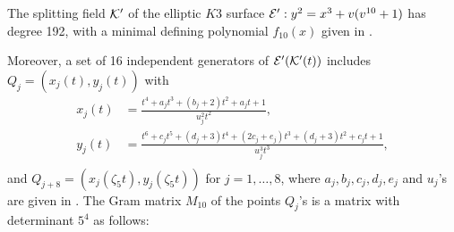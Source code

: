 \documentclass[11pt]{amsart}
\begin{document}
\begin{thm}
	\label{main1}
	The splitting field ${\mathcal K}'$ of the elliptic $K3$ surface  ${\mathcal E}': y^2=x^3+   v (v^{10}+1)$ has degree 192,  with  a minimal  defining polynomial $f_{10}(x)$ given in \cite[min-pols]{k3-codes}. 
	
	Moreover,  a set of 16 independent generators of ${\mathcal E}'({\mathcal K}'(t)) $ includes $Q_j=\left( x_j(t), y_j(t)\right) $ with
	$$\begin{aligned}
		x_j(t) &= \frac{t^4 + a_j t^3 + (b_j +2) t^2 + a_j t +1}{u_j^2  t^2}, \\
		y_j(t) &=\frac{t^6 +c_j t^5+ (d_j +3) t^4 +(2 c_j +e_j) t^3 +(d_j +3) t^2 + c_j t +1}{u_j^3 t^3},\\
	\end{aligned}
	$$
	and $Q_{j+8}=\left( x_{j}(\zeta_5 t), y_{j}( \zeta_5 t)\right) $  	for $j=1, \ldots, 8$,
	where   $a_j, b_j, c_j, d_j, e_j$  and  $u_j$'s are given in 
	 \cite[Points-10]{Shioda360-Codes}.
	 The Gram matrix $M_{10}$ of the  points $Q_j$'s is a matrix with determinant   $5^4$ as follows:
	 

\end{thm}
\end{document}
